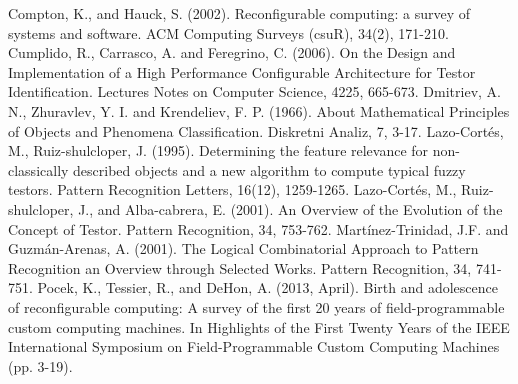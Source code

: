 \documentclass[conference]{IEEEtran}
\begin{document}
\begin{thebibliography}{20}

Compton, K., and Hauck, S. (2002). Reconfigurable computing: a survey of systems and software. ACM Computing Surveys (csuR), 34(2), 171-210.
 Cumplido, R., Carrasco, A. and Feregrino, C. (2006). On the Design and Implementation of a High Performance Configurable Architecture for Testor Identification. Lectures Notes on Computer Science, 4225, 665-673.
 Dmitriev, A. N.,  Zhuravlev, Y. I. and Krendeliev, F. P. (1966). About Mathematical Principles of Objects and Phenomena Classification. Diskretni Analiz, 7, 3-17.
Lazo-Cort\'es, M., Ruiz-shulcloper, J. (1995). Determining the feature relevance for non-classically described objects and a new algorithm to compute typical fuzzy testors. Pattern Recognition Letters, 16(12), 1259-1265.
Lazo-Cort\'es, M., Ruiz-shulcloper, J., and Alba-cabrera, E. (2001). An Overview of the Evolution of the Concept of Testor. Pattern Recognition, 34, 753-762.
Mart\'inez-Trinidad, J.F. and Guzm\'an-Arenas, A. (2001). The Logical Combinatorial Approach to Pattern Recognition an Overview through Selected Works. Pattern Recognition, 34, 741-751.
Pocek, K., Tessier, R., and DeHon, A. (2013, April). Birth and adolescence of reconfigurable computing: A survey of the first 20 years of field-programmable custom computing machines. In Highlights of the First Twenty Years of the IEEE International Symposium on Field-Programmable Custom Computing Machines (pp. 3-19).

\end{thebibliography}
\end{document}
